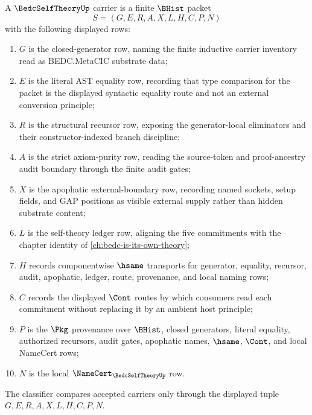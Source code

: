 \begin{definition}
\label{def:bedc-self-theory-commitment-carrier}
A $\BedcSelfTheoryUp$ carrier is a finite $\BHist$ packet
$$
S=(G,E,R,A,X,L,H,C,P,N)
$$
with the following displayed rows:
\begin{enumerate}
\item $G$ is the closed-generator row, naming the finite inductive carrier inventory read as BEDC.MetaCIC substrate data;
\item $E$ is the literal AST equality row, recording that type comparison for the packet is the displayed syntactic equality route and not an external conversion principle;
\item $R$ is the structural recursor row, exposing the generator-local eliminators and their constructor-indexed branch discipline;
\item $A$ is the strict axiom-purity row, reading the source-token and proof-ancestry audit boundary through the finite audit gates;
\item $X$ is the apophatic external-boundary row, recording named sockets, setup fields, and GAP positions as visible external supply rather than hidden substrate content;
\item $L$ is the self-theory ledger row, aligning the five commitments with the chapter identity of \autoref{ch:bedc-is-its-own-theory};
\item $H$ records componentwise $\hsame$ transports for generator, equality, recursor, audit, apophatic, ledger, route, provenance, and local naming rows;
\item $C$ records the displayed $\Cont$ routes by which consumers read each commitment without replacing it by an ambient host principle;
\item $P$ is the $\Pkg$ provenance over $\BHist$, closed generators, literal equality, authorized recursors, audit gates, apophatic names, $\hsame$, $\Cont$, and local NameCert rows;
\item $N$ is the local $\NameCert_{\BedcSelfTheoryUp}$ row.
\end{enumerate}
The classifier compares accepted carriers only through the displayed tuple $G,E,R,A,X,L,H,C,P,N$.
\end{definition}

